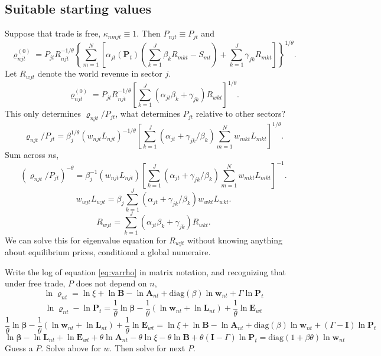 \documentclass[12pt]{article}
\begin{document}
\subsection{Suitable starting values}
Suppose that trade is free, $\kappa_{nmjt}\equiv 1$. Then $P_{njt}\equiv P_{jt}$ and
\begin{equation*}
	\varrho_{njt}^{(0)} = 
	P_{jt}
	R_{njt}^{-1/\theta}
	\left\{
	\sum_{m=1}^N
		\left[
			\alpha_{jt}(\mathbf P_t)
			\left(
				\sum_{k=1}^J\beta_k R_{mkt} - S_{mt}
			\right)
			+ \sum_{k=1}^J\gamma_{jk}R_{mkt}
		\right]
	\right\}^{1/\theta}.
\end{equation*}
Let $R_{wjt}$ denote the world revenue in sector $j$.
\begin{equation*}
	\varrho_{njt}^{(0)} = 
	P_{jt}
	R_{njt}^{-1/\theta}
		\left[
				\sum_{k=1}^J
				(\alpha_{jt}\beta_k + \gamma_{jk}) R_{wkt}
		\right]^{1/\theta}.
\end{equation*}
This only determines $\varrho_{njt}/P_{jt}$, what determines $P_{jt}$ relative to other sectors?\begin{equation*}
	\varrho_{njt}/P_{jt} = 
	\beta_j^{1/\theta}
	(w_{njt}L_{njt})^{-1/\theta}
		\left[
				\sum_{k=1}^J
				(\alpha_{jt} + \gamma_{jk}/\beta_k) 
				\sum_{m=1}^N w_{mkt}L_{mkt}
		\right]^{1/\theta}.
\end{equation*}
Sum across $n$s,
\begin{equation*}
	(\varrho_{njt}/P_{jt})^{-\theta} = 
	\beta_j^{-1}
	(w_{njt}L_{njt})
		\left[
				\sum_{k=1}^J
				(\alpha_{jt} + \gamma_{jk}/\beta_k) 
				\sum_{m=1}^N w_{mkt}L_{mkt}
		\right]^{-1}.
\end{equation*}
\begin{equation*}
	w_{wjt}L_{wjt}
	= \beta_j
				\sum_{k=1}^J
				(\alpha_{jt} + \gamma_{jk}/\beta_k) 
				w_{wkt}L_{wkt}.
\end{equation*}
\begin{equation*}
	R_{wjt}
	=
			\sum_{k=1}^J
			(\alpha_{jt}\beta_k + \gamma_{jk}) 
			R_{wkt}.
\end{equation*}
We can solve this for eigenvalue equation for $R_{wjt}$ without knowing anything about equilibrium prices, conditional a global numeraire.


Write the log of equation \eqref{eq:varrho} in matrix notation, and recognizing that under free trade, $P$ does not depend on $n$,
\[
\ln\mathbf \varrho_{nt} = \ln\xi
	+ \ln\mathbf B
	- \ln\mathbf A_{nt}
	+ \text{diag}(\beta) \ln\mathbf w_{nt}
	+ \Gamma \ln\mathbf P_{t}  
\]
\[
\ln\mathbf \varrho_{nt} - \ln\mathbf P_{t} 
 = \frac1\theta\ln\mathbf\beta
 	-\frac1\theta(\ln \mathbf w_{nt}+ \ln \mathbf L_{nt})
 	+\frac1\theta \ln \mathbf E_{wt}
\]
\[
\frac1\theta\ln\mathbf\beta
 	-\frac1\theta(\ln \mathbf w_{nt}+ \ln \mathbf L_{nt})
 	+\frac1\theta \ln \mathbf E_{wt}
=
\ln\xi
	+ \ln\mathbf B
	- \ln\mathbf A_{nt}
	+ \text{diag}(\beta) \ln\mathbf w_{nt}
	+ (\Gamma-\mathbf I) \ln\mathbf P_{t}
\]
\[
\ln\mathbf\beta
 	-\ln \mathbf L_{nt}
 	+ \ln \mathbf E_{wt}
	+ \theta\ln\mathbf A_{nt}
	-\theta\ln\xi
	- \theta\ln\mathbf B
	+ \theta(\mathbf I-\Gamma) \ln\mathbf P_{t}
=
	 \text{diag}(1+\beta\theta) \ln\mathbf w_{nt}
\]
Guess a $P$. Solve above for $w$. Then solve for next $P$.
\end{document}
